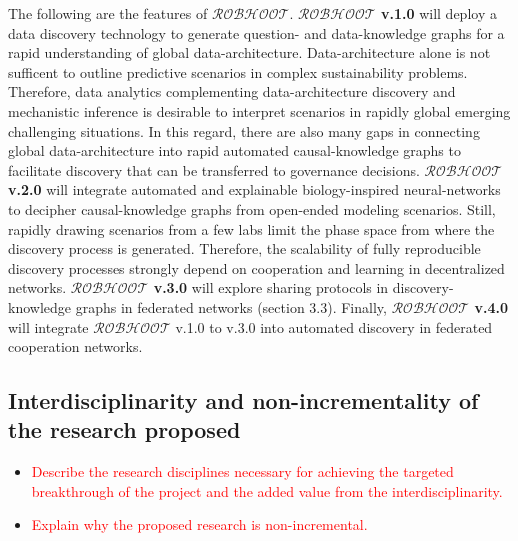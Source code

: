 \documentclass[11pt, a4paper]{article} %
\begin{document}
The following are the features of {\bf $\mathcal{ROBHOOT}$}. {\bf
  $\mathcal{ROBHOOT}$ v.1.0} will deploy a data discovery technology
to generate question- and data-knowledge graphs for a rapid
understanding of global data-architecture. Data-architecture alone is
not sufficent to outline predictive scenarios in complex
sustainability problems. Therefore, data analytics complementing
data-architecture discovery and mechanistic inference is desirable to
interpret scenarios in rapidly global emerging challenging
situations. In this regard, there are also many gaps in connecting
global data-architecture into rapid automated causal-knowledge graphs
to facilitate discovery that can be transferred to governance
decisions. {\bf $\mathcal{ROBHOOT}$ v.2.0} will integrate automated
and explainable biology-inspired neural-networks to decipher
causal-knowledge graphs from open-ended modeling scenarios. Still,
rapidly drawing scenarios from a few labs limit the phase space from
where the discovery process is generated. Therefore, the scalability
of fully reproducible discovery processes strongly depend on
cooperation and learning in decentralized networks. {\bf
  $\mathcal{ROBHOOT}$ v.3.0} will explore sharing protocols in
discovery-knowledge graphs in federated networks (section
3.3). Finally, {\bf $\mathcal{ROBHOOT}$ v.4.0} will integrate
$\mathcal{ROBHOOT}$ v.1.0 to v.3.0 into automated discovery in
federated cooperation networks.

\subsection{Interdisciplinarity and non-incrementality of the research
  proposed}

\begin{itemize}
\item \textcolor{red}{Describe the research disciplines necessary for
    achieving the targeted breakthrough of the project and the added
    value from the interdisciplinarity.}
\item \textcolor{red}{Explain why the proposed research is
    non-incremental.}
  \end{itemize}
\end{document}
